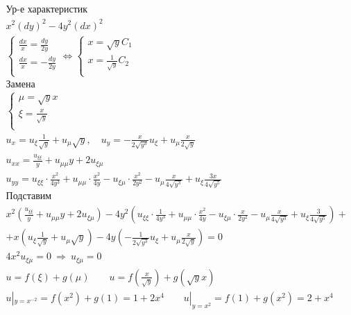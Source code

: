 \begin{gather*}
  \text{Ур-е характеристик} \\
  x^{2}(dy)^{2}-4y^{2}(dx)^{2} \\
  \begin{cases}
    \frac{dx}{x} = \frac{dy}{2y} \\ \frac{dx}{x}= - \frac{dy}{2y} \\
  \end{cases} \Leftrightarrow
  \begin{cases}
    x = \sqrt{y}C_{1} \\ x = \frac{1}{\sqrt{y}}C_{2} \\
  \end{cases} \\
  \text{Замена} \\
  \begin{cases}
    \mu =\sqrt{y}x \\ \xi =\frac{x}{\sqrt{y}} \\
  \end{cases} \\
  u_{x}=u_{\xi} \frac{1}{\sqrt{y}}+ u_{\mu}\sqrt{y}, \quad u_{y}= - 
  \frac{x}{2 \sqrt{y^{3}}}u_{\xi} + u_{\mu} \frac{x}{2 \sqrt{y}} \\
  u_{xx}= \frac{u_{\xi \xi}}{y} + u_{\mu \mu} y + 2 u_{\xi \mu} \\
  u_{yy}=u_{\xi \xi} \cdot \frac{x^{2}}{4y^{3}} + u_{\mu \mu} \cdot \frac{x^{2}}{4y} - u_{\xi \mu}
  \cdot \frac{x^{2}}{2 y^{2}} - u_{\mu} \frac{x}{4 \sqrt{y^{3}}} + u_{\xi} \frac{3x}{4 \sqrt{y^{5}}} \\
  \text{Подставим} \\
  x^{2}(\frac{u_{\xi \xi}}{y} + u_{\mu \mu} y + 2 u_{\xi \mu})-4y^{2}(u_{\xi \xi} \cdot \frac{1}{4y^{3}} + u_{\mu \mu} \cdot \frac{x^{2}}{4y} - u_{\xi \mu}
  \cdot \frac{x}{2 y^{2}} - u_{\mu} \frac{x}{4 \sqrt{y^{3}}} + u_{\xi} \frac{3}{4 \sqrt{y^{5}}}) +\\
  +x(u_{\xi} \frac{1}{\sqrt{y}}+ u_{\mu}\sqrt{y})-4y(- 
  \frac{1}{2 \sqrt{y^{3}}}u_{\xi} + u_{\mu} \frac{x}{2 \sqrt{y}} ) = 0 \\
  4x^{2}u_{\xi\mu}=0 \ \Rightarrow \ u_{\xi\mu}=0 \\
  u = f(\xi)+g(\mu) \qquad u = f(\frac{x}{\sqrt{y}})+g(\sqrt{y}x) \\
  u|_{y=x^{-2}}=f(x^{2})+g(1)=1+2x^{4} \qquad u|_{y=x^{2}}=f(1)+g(x^{2})=2+x^{4} \\
\end{gather*} \\
